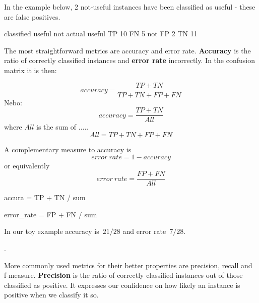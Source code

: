 
In the example below, 2 not-useful instances have been classified as useful -  these are false positives.

\begin{code}
        classified    useful       not
actual
useful                TP 10        FN  5
not                   FP  2        TN  11
\end{code}


The most straightforward metrics are accuracy and error rate.
{\bf Accuracy} is the ratio of correctly classified instances and {\bf error rate} incorrectly.
In the confusion matrix it is then:

\newcommand\TP{\mathit{TP}}  %
\newcommand\TN{\mathit{TN}}
\newcommand\FP{\mathit{FP}}
\newcommand\FN{\mathit{FN}}
\newcommand\ALL{\mathit{All}}
\begin{equation}
\mathit{accuracy} = \frac{\TP + \TN}{\TP + \TN + \FP + \FN}
\end{equation}
Nebo:
\begin{equation}
\mathit{accuracy} = \frac{\TP + \TN}{\ALL}
\end{equation}
where $\ALL$ is the sum of .....
\begin{equation}
\ALL = \TP + \TN + \FP + \FN
\end{equation}

A complementary measure to accuracy is 
\begin{equation}
\mathit{error~rate} = 1 - \mathit{accuracy}
\end{equation}
or equivalently
\begin{equation}
\mathit{error~rate} = \frac{\FP + \FN}{\ALL}
\end{equation}



accura = TP + TN / sum

error\_rate = FP + FN / sum

In our toy example accuracy is~$21/28$ and error rate~$7/28$.

.

More commonly used metrics for their better properties are precision, recall and f-measure.
{\bf Precision} is the ratio of correctly classified instances out of those classified as positive.
It expresses our confidence on how likely an instance is positive when we classify it so.

